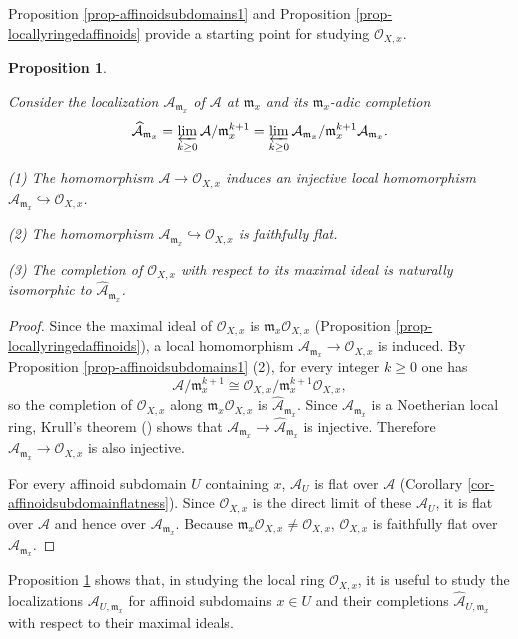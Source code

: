 \documentclass[a4paper,12pt, dvipdfmx]{jsbook}
\def\O{\mathscr{O}}
\def\m{\mathfrak{m}}
\theoremstyle{plain}
\newtheorem{prop}[thm]{\bfseries Proposition}
\theoremstyle{definition}
\begin{document}
Proposition \ref{prop-affinoidsubdomains1} and Proposition \ref{prop-locallyringedaffinoids} provide a starting point for studying $\O_{X,x}$.
\begin{prop}\label{prop-localringsaffinoids}{\rm 
Consider the localization $\mathcal{A}_{\m_x}$ of $\mathcal{A}$ at $\m_x$ and its $\m_x$-adic completion
$$
\widehat{\mathcal{A}}_{\m_x}=\varprojlim_{k\geq 0}\mathcal{A}/\m^{k+1}_x=\varprojlim_{k\geq 0}\mathcal{A}_{\m_x}/\m^{k+1}_x\mathcal{A}_{\m_x}.
$$

(1) The homomorphism $\mathcal{A}\rightarrow\O_{X,x}$ induces an injective local homomorphism $\mathcal{A}_{\m_x}\hookrightarrow\O_{X,x}$.

(2) The homomorphism $\mathcal{A}_{\m_x}\hookrightarrow\O_{X,x}$ is faithfully flat.

(3) The completion of $\O_{X,x}$ with respect to its maximal ideal is naturally isomorphic to $\widehat{\mathcal{A}}_{\m_x}$.}
\end{prop}

\begin{proof}[Proof]
Since the maximal ideal of $\O_{X,x}$ is $\m_x\O_{X,x}$ (Proposition \ref{prop-locallyringedaffinoids}), a local homomorphism $\mathcal{A}_{\m_x}\rightarrow\O_{X,x}$ is induced.
By Proposition \ref{prop-affinoidsubdomains1} (2), for every integer $k\geq 0$ one has
$$
\mathcal{A}/\m^{k+1}_x\cong\O_{X,x}/\m^{k+1}_x\O_{X,x},
$$
so the completion of $\O_{X,x}$ along $\m_x\O_{X,x}$ is $\widehat{\mathcal{A}}_{\m_x}$.
Since $\mathcal{A}_{\m_x}$ is a Noetherian local ring, Krull's theorem (\cite[Theorem 8.10]{Matsu}) shows that $\mathcal{A}_{\m_x}\rightarrow\widehat{\mathcal{A}}_{\m_x}$ is injective.
Therefore $\mathcal{A}_{\m_x}\rightarrow\O_{X,x}$ is also injective.

For every affinoid subdomain $U$ containing $x$, $\mathcal{A}_U$ is flat over $\mathcal{A}$ (Corollary \ref{cor-affinoidsubdomainflatness}).
Since $\O_{X,x}$ is the direct limit of these $\mathcal{A}_U$, it is flat over $\mathcal{A}$ and hence over $\mathcal{A}_{\m_x}$.
Because $\m_x\O_{X,x}\neq\O_{X,x}$, $\O_{X,x}$ is faithfully flat over $\mathcal{A}_{\m_x}$.
\end{proof}

Proposition \ref{prop-localringsaffinoids} shows that, in studying the local ring $\O_{X,x}$, it is useful to study the localizations $\mathcal{A}_{U,\m_x}$ for affinoid subdomains $x\in U$ and their completions $\widehat{\mathcal{A}}_{U,\m_x}$ with respect to their maximal ideals.
\end{document}
